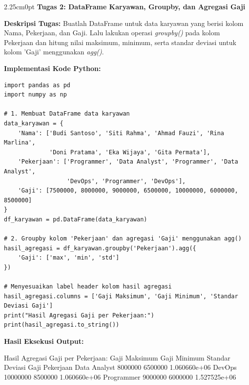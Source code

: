 \documentclass[12pt,a4paper]{article}
\begin{document}
\newpage
{}
\begin{adjustwidth}{2.25cm}{0pt}
\hspace*{-0.75cm}\textbf{\normalsize Tugas 2: DataFrame Karyawan, Groupby, dan Agregasi Gaji}\par
\vspace{0.12cm}

\textbf{Deskripsi Tugas:}  
Buatlah DataFrame untuk data karyawan yang berisi kolom Nama, Pekerjaan, dan Gaji. Lalu lakukan operasi \textit{groupby()} pada kolom Pekerjaan dan hitung nilai maksimum, minimum, serta standar deviasi untuk kolom 'Gaji' menggunakan \textit{agg()}.

\vspace{0.12cm}
\textbf{Implementasi Kode Python:}
\begin{lstlisting}
import pandas as pd
import numpy as np

# 1. Membuat DataFrame data karyawan
data_karyawan = {
    'Nama': ['Budi Santoso', 'Siti Rahma', 'Ahmad Fauzi', 'Rina Marlina', 
             'Doni Pratama', 'Eka Wijaya', 'Gita Permata'],
    'Pekerjaan': ['Programmer', 'Data Analyst', 'Programmer', 'Data Analyst', 
                  'DevOps', 'Programmer', 'DevOps'],
    'Gaji': [7500000, 8000000, 9000000, 6500000, 10000000, 6000000, 8500000]
}
df_karyawan = pd.DataFrame(data_karyawan)

# 2. Groupby kolom 'Pekerjaan' dan agregasi 'Gaji' menggunakan agg()
hasil_agregasi = df_karyawan.groupby('Pekerjaan').agg({
    'Gaji': ['max', 'min', 'std']
})

# Menyesuaikan label header kolom hasil agregasi
hasil_agregasi.columns = ['Gaji Maksimum', 'Gaji Minimum', 'Standar Deviasi Gaji']
print("Hasil Agregasi Gaji per Pekerjaan:")
print(hasil_agregasi.to_string())
\end{lstlisting}

\textbf{Hasil Eksekusi Output:}
\begin{outputbox}
Hasil Agregasi Gaji per Pekerjaan:
              Gaji Maksimum  Gaji Minimum  Standar Deviasi Gaji
Pekerjaan                                                      
Data Analyst        8000000       6500000          1.060660e+06
DevOps             10000000       8500000          1.060660e+06
Programmer          9000000       6000000          1.527525e+06
\end{outputbox}


\end{adjustwidth}
\end{document}
